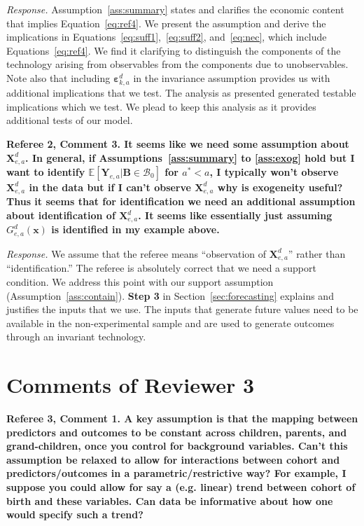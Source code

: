 \noindent \textit{Response.} Assumption~\ref{ass:summary} states and clarifies the economic content that implies Equation~\eqref{eq:ref4}. We present the assumption and derive the implications in Equations~\eqref{eq:suff1},~\eqref{eq:suff2}, and~\eqref{eq:nec},  which include Equations~\eqref{eq:ref4}. We find it clarifying to distinguish the components of the technology arising from observables from the components due to unobservables. Note also that including $\bm{\varepsilon}_{k,a}^d$ in the invariance assumption provides us with additional implications that we test. The analysis as presented generated testable implications which we test. We plead to keep this analysis as it provides additional tests of our model. 

\noindent \textbf{Referee 2, Comment 3. It seems like we need some assumption about $\bm{X}_{e,a}^d$. In general, if Assumptions~\ref{ass:summary} to \ref{ass:exog} hold but I want to identify $\mathbb{E} \left[ \bm{Y}_{e,a} | \bm{B} \in \mathcal{B}_0 \right]$ for $a^* < a$, I typically won't observe $\bm{X}_{e,a}^d$ in the data but if I can't observe $\bm{X}_{e,a}^d$ why is exogeneity useful? Thus it seems that for identification we need an additional assumption about identification of $\bm{X}_{e,a}^d$. It seems like essentially just assuming $G_{e,a}^d \left( \bm{x} \right)$ is identified in my example above.} 

\noindent \textit{Response.} We assume that the referee means ``observation of $\bm{X}_{e,a}^d$'' rather than ``identification.'' The referee is absolutely correct that we need a support condition. We address this point with our support assumption (Assumption~\ref{ass:contain}). \textbf{Step 3} in Section~\ref{sec:forecasting} explains and justifies the inputs that we use. The inputs that generate future values need to be available in the non-experimental sample and are used to generate outcomes through an invariant technology. 

\section*{Comments of Reviewer 3}

\noindent \textbf{Referee 3, Comment 1. A key assumption is that the mapping between predictors and outcomes to be constant across children, parents, and grand-children, once you control for background variables. Can't this assumption be relaxed to allow for interactions between cohort and predictors/outcomes in a parametric/restrictive way? For example, I suppose you could allow for say a (e.g. linear) trend between cohort of birth and these variables. Can data be informative about how one would specify such a trend?}

